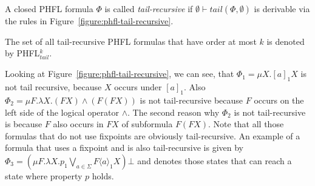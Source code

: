 \begin{definition}
    A closed PHFL formula $\Phi$ is called \emph{tail-recursive} if $\emptyset \vdash tail(\Phi, \emptyset)$ is
    derivable via the rules in Figure~\ref{figure:phfl-tail-recursive}.
\end{definition}

The set of all tail-recursive PHFL formulas that have order at most $k$ is denoted by PHFL$^k_{tail}$.

\begin{example}{\cite{lange2014capturing}}
    Looking at Figure~\ref{figure:phfl-tail-recursive}, we can see, that $\Phi_1 = \mu X.[a]_1 X$ is not tail
    recursive, because $X$ occurs under $[a]_1$. Also $\Phi_2 = \mu F .\lambda X. (F X) \wedge (F(F X))$
    is not tail-recursive because $F$ occurs on the left side of the logical operator $\wedge$. The second reason why
    $\Phi_2$ is not tail-recursive is because $F$ also occurs in $F X$ of subformula $F (F X)$. 
    Note that all those formulas that do not use fixpoints are obviously tail-recursive. An 
    example of a formula that uses a fixpoint and is also tail-recursive is given by 
    $\Phi_3 = (\mu F. \lambda X. p_1 \underset{a \in \Sigma}{\bigvee} F \langle a \rangle_1  X) \bot$ and denotes those states that can reach a state where property $p$ holds.
    
\end{example}